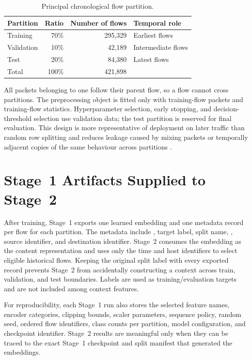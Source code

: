 \documentclass[11pt,fleqn]{report}
\begin{document}
\begin{table}[H]
    \centering
    \caption{Principal chronological flow partition.}
    \label{tab:chronological_split}
    \begin{tabular}{@{}lrrl@{}}
        \toprule
        Partition & Ratio & Number of flows & Temporal role \\
        \midrule
        Training & 70\% & 295,329 & Earliest flows \\
        Validation & 10\% & 42,189 & Intermediate flows \\
        Test & 20\% & 84,380 & Latest flows \\
        \midrule
        Total & 100\% & 421,898 & \\
        \bottomrule
    \end{tabular}
\end{table}

All packets belonging to one  follow their parent flow, so a flow cannot cross partitions. The preprocessing object is fitted only with training-flow packets and training-flow statistics. Hyperparameter selection, early stopping, and decision-threshold selection use validation data; the test partition is reserved for final evaluation. This design is more representative of deployment on later traffic than random row splitting and reduces leakage caused by mixing packets or temporally adjacent copies of the same behaviour across partitions \cite{SommerPaxson2010,Arp2022DosDonts}.

\section{Stage~1 Artifacts Supplied to Stage~2}
\label{subsec:stage2_artifacts}

After training, Stage~1 exports one learned embedding and one metadata record per flow for each partition. The metadata include , target label, split name, , source identifier, and destination identifier. Stage~2 consumes the embedding as the content representation and uses only the time and host identifiers to select eligible historical flows. Keeping the original split label with every exported record prevents Stage~2 from accidentally constructing a context across train, validation, and test boundaries. Labels are used as training/evaluation targets and are not included among context features.

For reproducibility, each Stage~1 run also stores the selected feature names, encoder categories, clipping bounds, scaler parameters, sequence policy, random seed, ordered flow identifiers, class counts per partition, model configuration, and checkpoint identifier. Stage~2 results are meaningful only when they can be traced to the exact Stage~1 checkpoint and split manifest that generated the embeddings.
\end{document}
